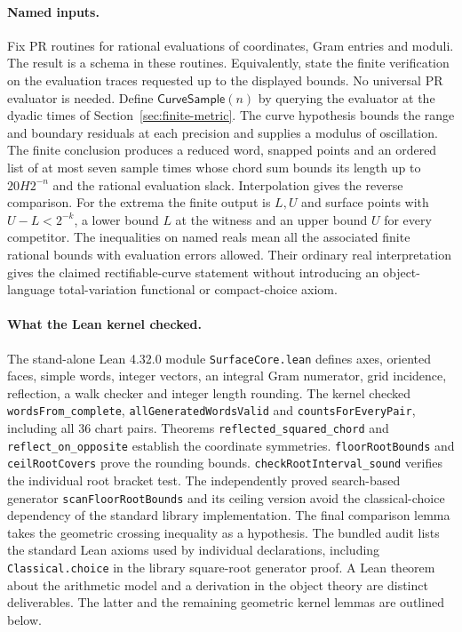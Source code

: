 \documentclass[10pt,letterpaper]{article}
\begin{document}
\paragraph{Named inputs.}
Fix PR routines for rational evaluations of coordinates, Gram entries
and moduli. The result is a schema in these routines. Equivalently,
state the finite verification on the evaluation traces requested up
to the displayed bounds. No universal PR evaluator is needed.
Define $\mathsf{CurveSample}(n)$ by querying the evaluator at the
dyadic times of Section~\ref{sec:finite-metric}. The curve hypothesis
bounds the range and boundary residuals at each precision and supplies
a modulus of oscillation. The finite conclusion produces a reduced
word, snapped points and an ordered list of at most seven sample times
whose chord sum bounds its length up to $20H2^{-n}$ and the rational
evaluation slack. Interpolation gives the reverse comparison. For the
extrema the finite output is $L,U$ and surface points with
$U-L<2^{-k}$, a lower bound $L$ at the witness and an upper bound
$U$ for every competitor. The inequalities on named reals mean all
the associated finite rational bounds with evaluation errors allowed.
Their ordinary real interpretation gives the claimed rectifiable-curve
statement without introducing an object-language total-variation
functional or compact-choice axiom.

\paragraph{What the Lean kernel checked.}
The stand-alone Lean 4.32.0 module \texttt{SurfaceCore.lean} defines
axes, oriented faces, simple words, integer vectors, an integral Gram
numerator, grid incidence, reflection, a walk checker and integer
length rounding. The kernel checked \texttt{wordsFrom\_complete},
\texttt{allGeneratedWordsValid} and \texttt{countsForEveryPair},
including all 36 chart pairs. Theorems
\texttt{reflected\_squared\_chord} and
\texttt{reflect\_on\_opposite} establish the coordinate symmetries.
\texttt{floorRootBounds} and \texttt{ceilRootCovers} prove the
rounding bounds. \texttt{checkRootInterval\_sound} verifies the
individual root bracket test. The independently proved search-based
generator \texttt{scanFloorRootBounds} and its ceiling version avoid
the classical-choice dependency of the standard library implementation.
The final comparison lemma takes the
geometric crossing inequality as a hypothesis. The bundled audit
lists the standard Lean axioms used by individual declarations,
including \texttt{Classical.choice} in the library square-root
generator proof. A Lean theorem about the arithmetic model and a
derivation in the object theory are distinct deliverables. The latter
and the remaining geometric kernel lemmas are outlined below.
\end{document}
